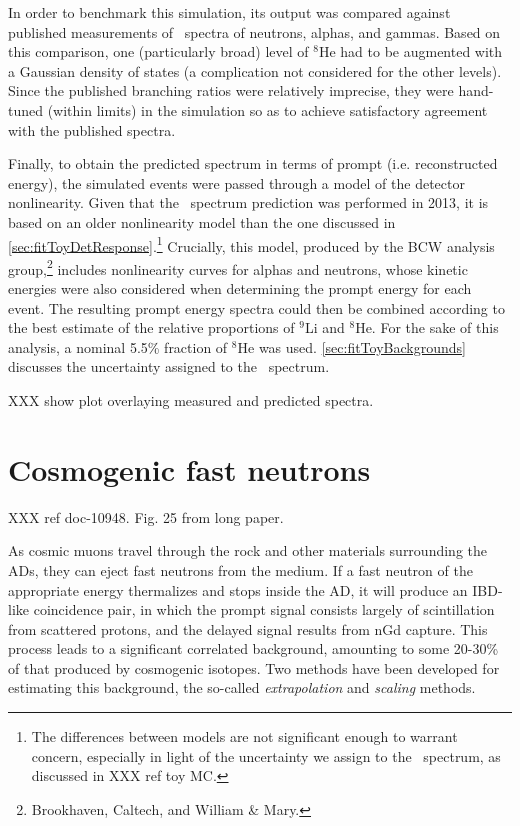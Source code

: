 \documentclass[../thesis.tex]{subfiles}
\begin{document}
In order to benchmark this simulation, its output was compared against published measurements of \LiHe\ spectra of neutrons, alphas, and gammas. Based on this comparison, one (particularly broad) level of $^8$He had to be augmented with a Gaussian density of states (a complication not considered for the other levels). Since the published branching ratios were relatively imprecise, they were hand-tuned (within limits) in the simulation so as to achieve satisfactory agreement with the published spectra.

Finally, to obtain the predicted spectrum in terms of prompt (i.e. reconstructed energy), the simulated events were passed through a model of the detector nonlinearity. Given that the \LiHe\ spectrum prediction was performed in 2013, it is based on an older nonlinearity model than the one discussed in \autoref{sec:fitToyDetResponse}.\footnote{The differences between models are not significant enough to warrant concern, especially in light of the uncertainty we assign to the \LiHe\ spectrum, as discussed in XXX ref toy MC.} Crucially, this model, produced by the BCW analysis group,\footnote{Brookhaven, Caltech, and William \& Mary.} includes nonlinearity curves for alphas and neutrons, whose kinetic energies were also considered when determining the prompt energy for each event. The resulting prompt energy spectra could then be combined according to the best estimate of the relative proportions of $^9$Li and $^8$He. For the sake of this analysis, a nominal 5.5\% fraction of $^8$He was used. \autoref{sec:fitToyBackgrounds} discusses the uncertainty assigned to the \LiHe\ spectrum.

XXX show plot overlaying measured and predicted spectra.

\section{Cosmogenic fast neutrons}

XXX ref doc-10948. Fig. 25 from long paper.

As cosmic muons travel through the rock and other materials surrounding the ADs, they can eject fast neutrons from the medium. If a fast neutron of the appropriate energy thermalizes and stops inside the AD, it will produce an IBD-like coincidence pair, in which the prompt signal consists largely of scintillation from scattered protons, and the delayed signal results from nGd capture. This process leads to a significant correlated background, amounting to some 20-30\% of that produced by cosmogenic isotopes. Two methods have been developed for estimating this background, the so-called \emph{extrapolation} and \emph{scaling} methods.
\end{document}
